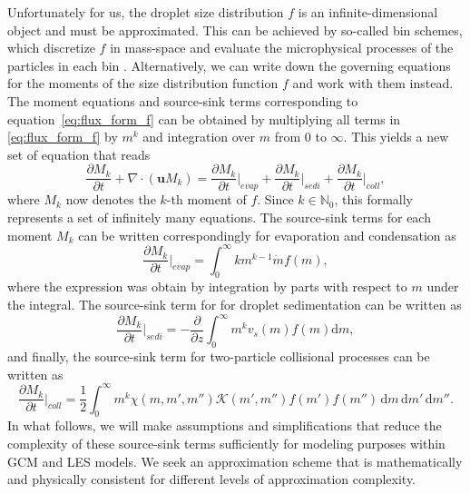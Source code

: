 \documentclass{report}
\begin{document}
Unfortunately for us, the droplet size distribution $f$ is an infinite-dimensional object and must be approximated. This can be achieved by so-called bin schemes, which discretize $f$ in mass-space and evaluate the microphysical processes of the particles in each bin \citep[cf.][]{}. Alternatively, we can write down the governing equations for the moments of the size distribution function $f$ and work with them instead. The moment equations and source-sink terms corresponding to equation~\eqref{eq:flux_form_f} can be obtained by multiplying all terms in \eqref{eq:flux_form_f} by $m^k$ and integration over $m$ from $0$ to $\infty$. This yields a new set of equation that reads
\begin{equation}
    \frac{\partial M_k}{\partial t} +\nabla \cdot (\mathbf{u} M_k) = \frac{\partial M_k}{\partial  t} \biggr\rvert_{evap} + \frac{\partial M_k}{\partial t} \biggr\rvert_{sedi} + \frac{\partial M_k}{\partial t} \biggr\rvert_{coll},
\label{eq:flux_form_mom}
\end{equation}
where $M_k$ now denotes the $k$-th moment of $f$. Since $k \in \mathbb{N}_0$, this formally represents a set of infinitely many equations. The source-sink terms for each moment $M_k$ can be written correspondingly for evaporation and condensation as
\begin{equation}
    \frac{\partial M_k}{\partial t} \biggr\rvert_{evap} = \int_0^\infty km^{k-1}\dot{m}f(m),
\label{eq:source_evap_mom}
\end{equation}
where the expression was obtain by integration by parts with respect to $m$ under the integral. The source-sink term for for droplet sedimentation can be written as
\begin{equation}
    \frac{\partial M_k}{\partial t} \biggr\rvert_{sedi} = -\frac{\partial}{\partial z}\int_0^\infty m^k v_s(m) f(m) \text{d}m,
\label{eq:source_sedi_mom}
\end{equation}
and finally, the source-sink term for two-particle collisional processes can be written as
\begin{equation}
    \frac{\partial M_k}{\partial t} \biggr\rvert_{coll} = \frac{1}{2} \int_0^\infty m^k \chi(m,m',m'') \mathcal{K}(m', m'')f(m')f(m'') \, \text{d}m\, \text{d}m' \,\text{d}{m''}.
\label{eq:source_cb_mom}
\end{equation}
In what follows, we will make assumptions and simplifications that reduce the complexity of these source-sink terms sufficiently for modeling purposes within GCM and LES models. We seek an approximation scheme that is mathematically and physically consistent for different levels of approximation complexity.
\end{document}
